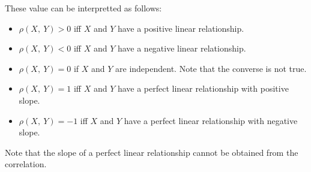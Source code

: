 \documentclass{article}
\begin{document}
\begin{multicols}{3}
    These value can be interpretted as follows:
    \begin{itemize}
        \item \(\rho\left( X,\: Y \right) > 0\) iff \(X\) and \(Y\) have a positive linear relationship.
        \item \(\rho\left( X,\: Y \right) < 0\) iff \(X\) and \(Y\) have a negative linear relationship.
        \item \(\rho\left( X,\: Y \right) = 0\) if \(X\) and \(Y\) are independent. Note that the converse is not true.
        \item \(\rho\left( X,\: Y \right) = 1\) iff \(X\) and \(Y\) have a perfect linear relationship with positive slope.
        \item \(\rho\left( X,\: Y \right) = -1\) iff \(X\) and \(Y\) have a perfect linear relationship with negative slope.
    \end{itemize}
    Note that the slope of a perfect linear relationship cannot be obtained from the correlation.
\end{multicols}
\end{document}
